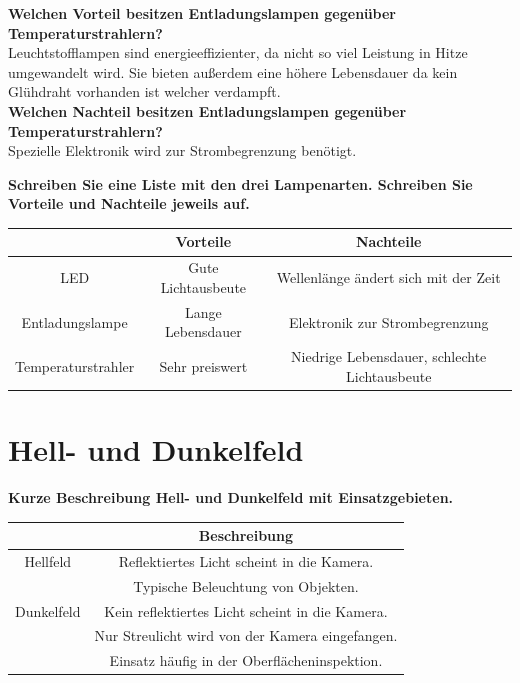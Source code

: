 \documentclass[a4paper]{article}
\begin{document}
	\textbf{Welchen Vorteil besitzen Entladungslampen gegenüber Temperaturstrahlern?}\\
	Leuchtstofflampen sind energieeffizienter, da nicht so viel Leistung in Hitze umgewandelt wird. Sie bieten außerdem eine höhere Lebensdauer da kein Glühdraht vorhanden ist welcher verdampft.\\
	
	\textbf{Welchen Nachteil besitzen Entladungslampen gegenüber Temperaturstrahlern?}\\
	Spezielle Elektronik wird zur Strombegrenzung benötigt.\\
	
	\newpage
	
	\textbf{Schreiben Sie eine Liste mit den drei Lampenarten. Schreiben Sie Vorteile und Nachteile jeweils auf.}\\
	\begin{center}
		\begin{tabular}{ c|c|c }
			& Vorteile & Nachteile \\ 
			\hline
			LED & Gute Lichtausbeute & Wellenlänge ändert sich mit der Zeit \\
			Entladungslampe & Lange Lebensdauer & Elektronik zur Strombegrenzung \\
			Temperaturstrahler & Sehr preiswert & Niedrige Lebensdauer, schlechte Lichtausbeute \\
		\end{tabular}
	\end{center}
	\vspace{10pt}
	
	\section{Hell- und Dunkelfeld}
	\textbf{Kurze Beschreibung Hell- und Dunkelfeld mit Einsatzgebieten.}\\
	\begin{center}
		\begin{tabular}{ c|c }
			 & Beschreibung \\ 
			\hline
			Hellfeld & Reflektiertes Licht scheint in die Kamera. \\
			& Typische Beleuchtung von Objekten.\\
			\hline
			Dunkelfeld & Kein reflektiertes Licht scheint in die Kamera.\\
			& Nur Streulicht wird von der Kamera eingefangen.\\
			& Einsatz häufig in der Oberflächeninspektion.\\
		\end{tabular}
	\end{center}
	\vspace{10pt}
	
\end{document}
